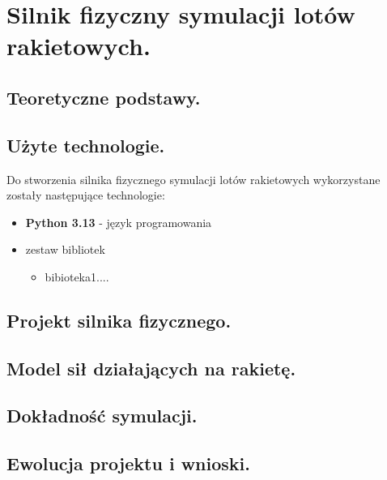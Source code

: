 \chapter{Silnik fizyczny symulacji lotów rakietowych.}\label{ch:silnik-fizyczny-symulacji-lotow-rakietowych.}

\section{Teoretyczne podstawy.}\label{sec:teoretyczne-podstawy.}
\section{Użyte technologie.}\label{sec:uzyte-technologie.}

Do stworzenia silnika fizycznego symulacji lotów rakietowych wykorzystane zostały następujące technologie:

\begin{itemize}
    \item \textbf{Python 3.13} - język programowania
    \item zestaw bibliotek
    \begin{itemize}
        \item bibioteka1....
    \end{itemize}
\end{itemize}

\section{Projekt silnika fizycznego.}\label{sec:projekt-silnika-fizycznego.}
\section{Model sił działających na rakietę.}\label{sec:model-si-dziaajacych-na-rakiete.}
\section{Dokładność symulacji.}\label{sec:dokadnosc-symulacji}
\section{Ewolucja projektu i wnioski.}\label{sec:ewolucja-projektu-i-wnioski}